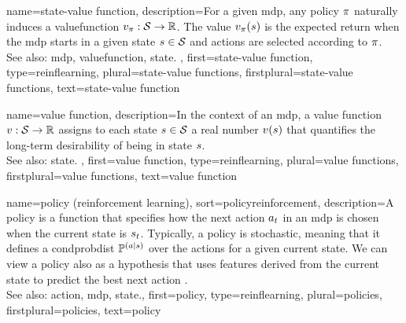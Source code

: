 {name={state-value function},
	description={For a given \gls{mdp}, any \gls{policy} $\pi$ naturally induces 
		a \gls{valuefunction} 
		$v_{\pi}:\mathcal{S} \rightarrow \mathbb{R}$. 
		The value $v_{\pi}(s)$ is the expected 
		return when the \gls{mdp} starts in a given \gls{state} $s \in \mathcal{S}$ 
		and \glspl{action} are selected according to $\pi$.
		\\
		See also: \gls{mdp}, \gls{valuefunction}, \gls{state}. },
	first={state-value function},
	type=reinflearning,
	plural={state-value functions},
	firstplural={state-value functions},
	text={state-value function}
}

{name={value function},
	description={In the context of an \gls{mdp}, a value \gls{function} 
		$v: \mathcal{S} \rightarrow \mathbb{R}$ assigns to each \gls{state} 
		$s \in \mathcal{S}$ a real number $v(s)$ that quantifies 
		the long-term desirability of being in \gls{state} $s$.
		\\
		See also: \gls{state}. },
	first={value function},
	type=reinflearning,
	plural={value functions},
	firstplural={value functions},
	text={value function}
}

{name={policy (reinforcement learning)},
sort={policyreinforcement},
	description={A policy is a \gls{function} that specifies how 
	 	the next \gls{action} $a_{t}$ in an \gls{mdp} 
		is chosen when the current \gls{state} is $s_{t}$. 
		Typically, a policy is \gls{stochastic}, meaning that it defines a 
		\gls{condprobdist} $\mathbb{P}^{(a \mid s)}$ over the 
		\glspl{action} for a given current \gls{state}. We can view 
		a policy also as a \gls{hypothesis} that uses \glspl{feature} 
		derived from the current \gls{state} to predict the best next 
		\gls{action} \cite{SuttonEd2}.
		\\
		See also: \gls{action}, \gls{mdp}, \gls{state}.},
	first={policy},
	type=reinflearning,
	plural={policies},
	firstplural={policies},
	text={policy}
}

